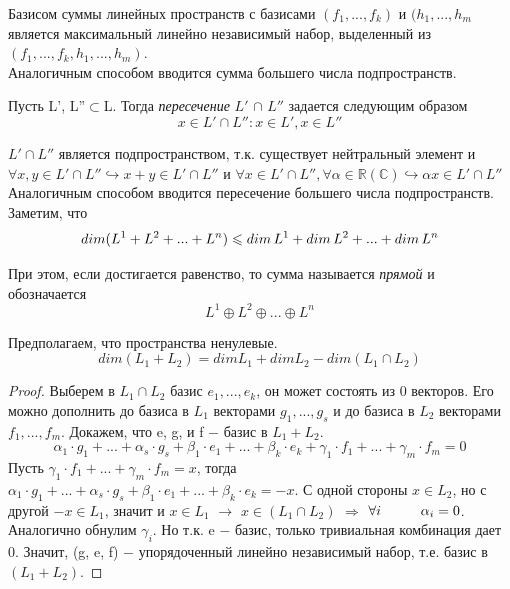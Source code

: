 Базисом суммы линейных пространств с базисами $(f_1, ..., f_k)$ и $(h_1, ..., h_m$ является максимальный линейно независимый набор, выделенный из $(f_1, ..., f_k, h_1, ..., h_m)$.\\

Аналогичным способом вводится сумма большего числа подпространств.\\

\begin{definition}
    Пусть L', L''$\subset$L. Тогда \textit{пересечение} $L'$ $\cap$ $L''$ задается следующим образом
    \[
    x \in L' \cap L'' : x \in L', x \in L''
    \]
\end{definition}

$L'\cap L''$ является подпространством, т.к. существует нейтральный элемент и $\forall x, y \in L'\cap L'' \hookrightarrow x + y \in L'\cap L''$ и $\forall x \in L'\cap L'', \forall \alpha \in \mathbb{R} (\mathbb{C}) \hookrightarrow \alpha x \in L' \cap L''$\\

Аналогичным способом вводится пересечение большего числа подпространств.\\

Заметим, что
\[
dim (L^1 + L^2 + ... + L^n) \leq dim\thinspace L^1 + dim\thinspace L^2 + ... + dim\thinspace L^n
\]

При этом, если достигается равенство, то сумма называется \textit{прямой} и обозначается
\[
L^1 \oplus L^2 \oplus ... \oplus L^n
\]








\begin{theorem}
    Предполагаем, что пространства ненулевые. 
    \[
    dim (L_1 + L_2) = dim L_1 + dim L_2 - dim (L_1 \cap L_2)
    \]
\end{theorem}
\begin{proof}
    Выберем в $L_1 \cap L_2$ базис $e_1, ..., e_k$, он может состоять из 0 векторов. Его можно дополнить до базиса в $L_1$ векторами $g_1, ..., g_s$ и до базиса в $L_2$ векторами $f_1, ..., f_m$. Докажем, что e, g, и f $-$ базис в $L_1 + L_2$.
    \[
    \alpha_1 \cdot g_1 + ... + \alpha_s \cdot g_s + \beta_1 \cdot e_1 + ... + \beta_k \cdot e_k + \gamma_1 \cdot f_1 + ... + \gamma_m \cdot f_m = 0
    \]
    Пусть $\gamma_1 \cdot f_1 + ... + \gamma_m \cdot f_m = x$, тогда $\alpha_1 \cdot g_1 + ... + \alpha_s \cdot g_s + \beta_1 \cdot e_1 + ... + \beta_k \cdot e_k = -x$. С одной стороны $x \in L_2$, но с другой $-x \in L_1$, значит и $x \in L_1$ $\longrightarrow$ $x \in (L_1 \cap L_2)$ $\Longrightarrow$ $\forall i \tab \alpha_i = 0$. Аналогично обнулим $\gamma_i$. Но т.к. e $-$ базис, только тривиальная комбинация дает 0. Значит, (g, e, f) $-$ упорядоченный линейно независимый набор, т.е. базис в $(L_1 + L_2)$.
\end{proof}

